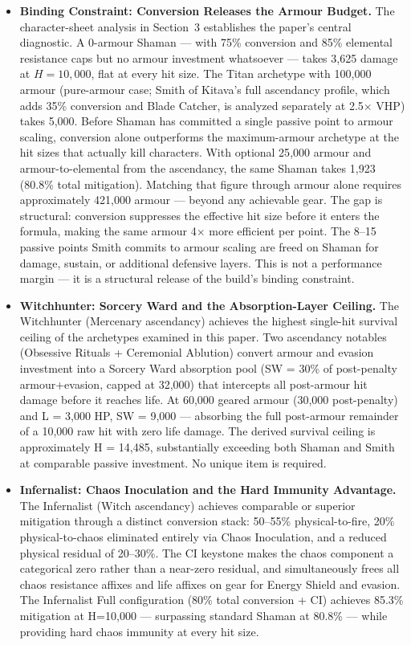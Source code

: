 \documentclass[12pt, letterpaper]{article}
\begin{document}
\begin{itemize}
    \item \textbf{Binding Constraint: Conversion Releases the Armour Budget.} The character-sheet analysis in Section~3 establishes the paper's central diagnostic. A 0-armour Shaman --- with 75\% conversion and 85\% elemental resistance caps but no armour investment whatsoever --- takes 3{,}625 damage at $H = 10{,}000$, flat at every hit size. The Titan archetype with 100{,}000 armour (pure-armour case; Smith of Kitava's full ascendancy profile, which adds 35\% conversion and Blade Catcher, is analyzed separately at 2.5$\times$ VHP) takes 5{,}000. Before Shaman has committed a single passive point to armour scaling, conversion alone outperforms the maximum-armour archetype at the hit sizes that actually kill characters. With optional 25{,}000 armour and armour-to-elemental from the ascendancy, the same Shaman takes 1{,}923 (80.8\% total mitigation). Matching that figure through armour alone requires approximately 421{,}000 armour --- beyond any achievable gear. The gap is structural: conversion suppresses the effective hit size before it enters the formula, making the same armour 4$\times$ more efficient per point. The 8--15 passive points Smith commits to armour scaling are freed on Shaman for damage, sustain, or additional defensive layers. This is not a performance margin --- it is a structural release of the build's binding constraint.

    \item \textbf{Witchhunter: Sorcery Ward and the Absorption-Layer Ceiling.} The Witchhunter (Mercenary ascendancy) achieves the highest single-hit survival ceiling of the archetypes examined in this paper. Two ascendancy notables (Obsessive Rituals + Ceremonial Ablution) convert armour and evasion investment into a Sorcery Ward absorption pool (SW = 30\% of post-penalty armour+evasion, capped at 32{,}000) that intercepts all post-armour hit damage before it reaches life. At 60{,}000 geared armour (30{,}000 post-penalty) and L = 3{,}000 HP, SW = 9{,}000 --- absorbing the full post-armour remainder of a 10{,}000 raw hit with zero life damage. The derived survival ceiling is approximately H = 14{,}485, substantially exceeding both Shaman and Smith at comparable passive investment. No unique item is required.

    \item \textbf{Infernalist: Chaos Inoculation and the Hard Immunity Advantage.} The Infernalist (Witch ascendancy) achieves comparable or superior mitigation through a distinct conversion stack: 50--55\% physical-to-fire, 20\% physical-to-chaos eliminated entirely via Chaos Inoculation, and a reduced physical residual of 20--30\%. The CI keystone makes the chaos component a categorical zero rather than a near-zero residual, and simultaneously frees all chaos resistance affixes and life affixes on gear for Energy Shield and evasion. The Infernalist Full configuration (80\% total conversion + CI) achieves 85.3\% mitigation at H=10{,}000 --- surpassing standard Shaman at 80.8\% --- while providing hard chaos immunity at every hit size.


\end{itemize}
\end{document}
